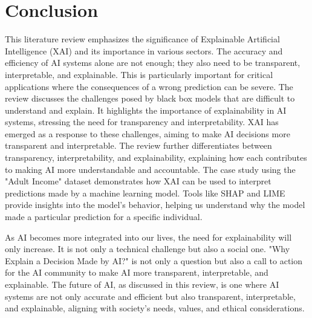 \documentclass[10pt,journal,compsoc]{IEEEtran}
\begin{document}
\section{Conclusion}

This literature review emphasizes the significance of Explainable Artificial Intelligence (XAI) and its importance in various sectors. 
The accuracy and efficiency of AI systems alone are not enough; they also need to be transparent, interpretable, and explainable. This is particularly 
important for critical applications where the consequences of a wrong prediction can be severe. The review discusses the challenges posed by black box models that 
are difficult to understand and explain. It highlights the importance of explainability in AI systems, stressing the need for transparency and interpretability. 
XAI has emerged as a response to these challenges, aiming to make AI decisions more transparent and interpretable. The review further differentiates between transparency, 
interpretability, and explainability, explaining how each contributes to making AI more understandable and accountable. The case study using the "Adult Income" dataset 
demonstrates how XAI can be used to interpret predictions made by a machine learning model. Tools like SHAP and LIME provide insights into the model's behavior, helping us 
understand why the model made a particular prediction for a specific individual.

As AI becomes more integrated into our lives, the need for explainability will only increase. It is not only a technical challenge but also a social one. 
"Why Explain a Decision Made by AI?" is not only a question but also a call to action for the AI community to make AI more transparent, interpretable, and explainable. 
The future of AI, as discussed in this review, is one where AI systems are not only accurate and efficient but also transparent, interpretable, and explainable, aligning 
with society's needs, values, and ethical considerations.

\printbibliography
\end{document}
